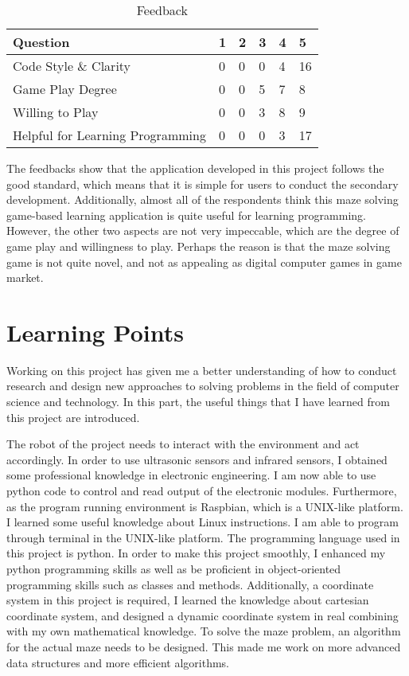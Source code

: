 \documentclass[11pt,times,oneside,openright,hardcopy]{eeereport}
\begin{document}
\begin{table}[h]
    \label{tab:tab1}
    \centering
    \caption{Feedback}
    \renewcommand{\arraystretch}{2}
    \setlength{\tabcolsep}{10pt}
    \begin{tabular}{ | m{8cm} | m{0.5cm} | m{0.5cm} | m{0.5cm} | m{0.5cm} | m{0.5cm} |} 
    \hline Question & 1 & 2 & 3 & 4 & 5\\
    \hline Code Style \& Clarity & 0 & 0 & 0 & 4 & 16 \\
    \hline Game Play Degree  & 0 & 0 & 5 & 7 & 8 \\
    \hline Willing to Play   & 0 & 0 & 3 & 8 & 9 \\
    \hline Helpful for Learning Programming & 0 & 0 & 0 & 3 & 17 \\
    \hline 
    \end{tabular} 
    \end{table}

The feedbacks show that the application developed in this project follows the good standard, which means that it is simple for users to conduct the secondary development.
Additionally, almost all of the respondents think this maze solving game-based learning application is quite useful for learning programming.
However, the other two aspects are not very impeccable, which are the degree of game play and willingness to play. 
Perhaps the reason is that the maze solving game is not quite novel, and not as appealing as digital computer games in game market.



\chapter{Learning Points}
Working on this project has given me a better understanding of how to conduct research and design new approaches to solving problems in the field of computer science and technology.
In this part, the useful things that I have learned from this project are introduced.

The robot of the project needs to interact with the environment and act accordingly. In order to use ultrasonic sensors and infrared sensors, I obtained some professional knowledge in electronic engineering.
I am now able to use python code to control and read output of the electronic modules. 
Furthermore, as the program running environment is Raspbian, which is a UNIX-like platform. I learned some useful knowledge about Linux instructions. I am able to program through terminal in the UNIX-like platform.
The programming language used in this project is python. In order to make this project smoothly, I enhanced my python programming skills as well as be proficient in object-oriented programming skills such as classes and methods.
Additionally, a coordinate system in this project is required, I learned the knowledge about cartesian coordinate system, and designed a dynamic coordinate system in real combining with my own mathematical knowledge.
To solve the maze problem, an algorithm for the actual maze needs to be designed. This made me work on more advanced data structures and more efficient algorithms.
\end{document}
